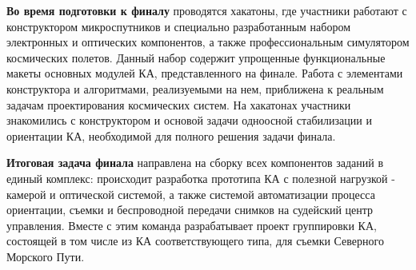 \textbf{Во время подготовки к финалу} проводятся хакатоны, где участники работают с конструктором микроспутников и специально разработанным набором электронных и оптических компонентов, а также профессиональным симулятором космических полетов. Данный набор содержит упрощенные функциональные макеты основных модулей КА, представленного на финале. Работа с элементами конструктора и алгоритмами, реализуемыми на нем, приближена к реальным задачам проектирования космических систем. На хакатонах участники знакомились с конструктором и основой задачи одноосной стабилизации и ориентации КА, необходимой для полного решения задачи финала. 

\textbf{Итоговая задача финала} направлена на сборку всех компонентов заданий в единый комплекс: происходит разработка прототипа КА с полезной нагрузкой - камерой и оптической системой, а также системой автоматизации процесса ориентации, съемки и беспроводной передачи снимков на судейский центр управления. Вместе с этим команда разрабатывает проект группировки КА, состоящей в том числе из КА соответствующего типа, для съемки Северного Морского Пути. 

\clearpage
\endgroup